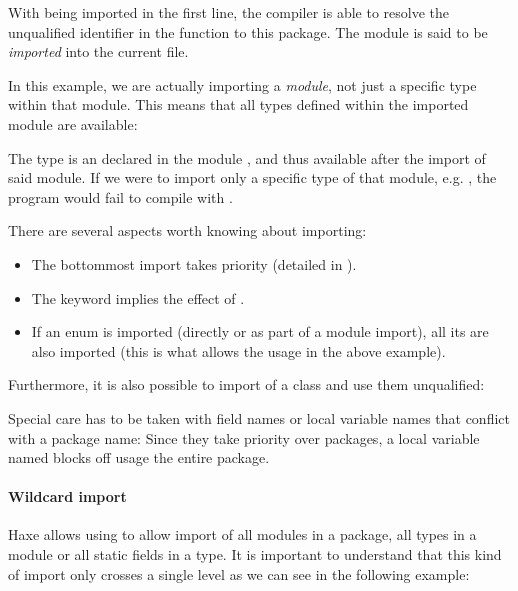 
With  being imported in the first line, the compiler is able to resolve the unqualified identifier  in the  function to this package. The module  is said to be \emph{imported} into the current file.

In this example, we are actually importing a \emph{module}, not just a specific type within that module. This means that all types defined within the imported module are available:


The type  is an  declared in the module , and thus available after the import of said module. If we were to import only a specific type of that module, e.g. , the program would fail to compile with .

There are several aspects worth knowing about importing:

\begin{itemize}
	\item The bottommost import takes priority (detailed in ).
	\item The  keyword  implies the effect of .
	\item If an enum is imported (directly or as part of a module import), all its  are also imported (this is what allows the  usage in the above example).
\end{itemize}

Furthermore, it is also possible to import  of a class and use them unqualified:


Special care has to be taken with field names or local variable names that conflict with a package name: Since they take priority over packages, a local variable named  blocks off usage the entire  package.

\paragraph{Wildcard import}

Haxe allows using  to allow import of all modules in a package, all types in a module or all static fields in a type. It is important to understand that this kind of import only crosses a single level as we can see in the following example:

